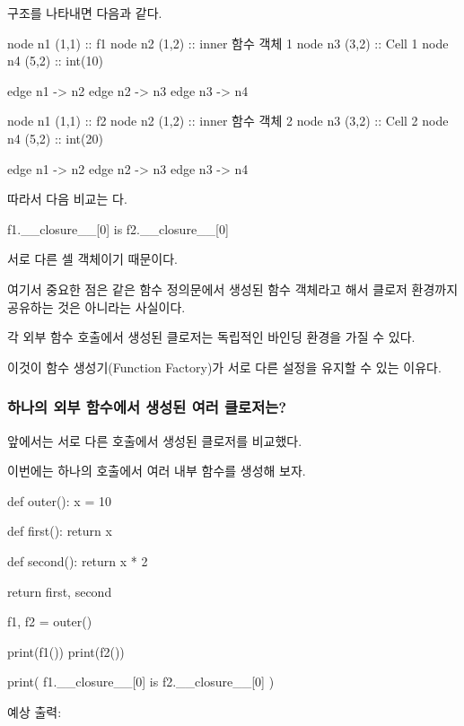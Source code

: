 구조를 나타내면 다음과 같다.

\begin{dhkdiagram}[in=6]
node n1 (1,1) :: f1
node n2 (1,2) :: inner 함수 객체 1
node n3 (3,2) :: Cell 1
node n4 (5,2) :: int(10)

edge n1 -> n2
edge n2 -> n3
edge n3 -> n4
\end{dhkdiagram}

\begin{dhkdiagram}[in=6]
node n1 (1,1) :: f2
node n2 (1,2) :: inner 함수 객체 2
node n3 (3,2) :: Cell 2
node n4 (5,2) :: int(20)

edge n1 -> n2
edge n2 -> n3
edge n3 -> n4
\end{dhkdiagram}

따라서 다음 비교는 다.

\begin{dhkcode}
f1.__closure__[0] is f2.__closure__[0]
\end{dhkcode}

서로 다른 셀 객체이기 때문이다.

여기서 중요한 점은 같은 함수 정의문에서 생성된 함수 객체라고 해서 클로저 환경까지 공유하는 것은 아니라는 사실이다.

각 외부 함수 호출에서 생성된 클로저는 독립적인 바인딩 환경을 가질 수 있다.

이것이 함수 생성기(Function Factory)가 서로 다른 설정을 유지할 수 있는 이유다.

\subsubsection{하나의 외부 함수에서 생성된 여러 클로저는?}

앞에서는 서로 다른  호출에서 생성된 클로저를 비교했다.

이번에는 하나의  호출에서 여러 내부 함수를 생성해 보자.

\begin{dhkcode}
def outer():
    x = 10

    def first():
        return x

    def second():
        return x * 2

    return first, second


f1, f2 = outer()

print(f1())
print(f2())

print(
    f1.__closure__[0]
    is f2.__closure__[0]
)
\end{dhkcode}

예상 출력:


